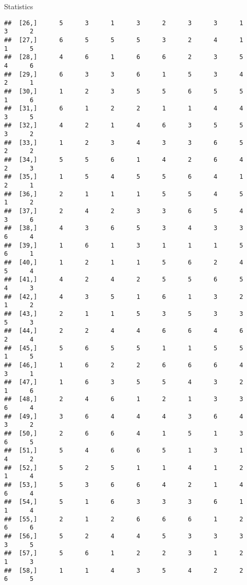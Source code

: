 \documentclass[
  ignorenonframetext,
]{beamer}
\begin{document}
\begin{frame}[fragile]{Statistics}
\begin{verbatim}
##  [26,]      5      3      1      3      2      3      3      1      3      2
##  [27,]      6      5      5      5      3      2      4      1      1      5
##  [28,]      4      6      1      6      6      2      3      5      4      6
##  [29,]      6      3      3      6      1      5      3      4      2      1
##  [30,]      1      2      3      5      5      6      5      5      1      6
##  [31,]      6      1      2      2      1      1      4      4      3      5
##  [32,]      4      2      1      4      6      3      5      5      3      2
##  [33,]      1      2      3      4      3      3      6      5      2      2
##  [34,]      5      5      6      1      4      2      6      4      2      3
##  [35,]      1      5      4      5      5      6      4      1      2      1
##  [36,]      2      1      1      1      5      5      4      5      1      2
##  [37,]      2      4      2      3      3      6      5      4      3      6
##  [38,]      4      3      6      5      3      4      3      3      6      4
##  [39,]      1      6      1      3      1      1      1      5      6      1
##  [40,]      1      2      1      1      5      6      2      4      5      4
##  [41,]      4      2      4      2      5      5      6      5      4      3
##  [42,]      4      3      5      1      6      1      3      2      1      2
##  [43,]      2      1      1      5      3      5      3      3      5      3
##  [44,]      2      2      4      4      6      6      4      6      2      4
##  [45,]      5      6      5      5      1      1      5      5      1      5
##  [46,]      1      6      2      2      6      6      6      4      3      1
##  [47,]      1      6      3      5      5      4      3      2      1      6
##  [48,]      2      4      6      1      2      1      3      3      6      4
##  [49,]      3      6      4      4      4      3      6      4      3      2
##  [50,]      2      6      6      4      1      5      1      3      6      5
##  [51,]      5      4      6      6      5      1      3      1      4      2
##  [52,]      5      2      5      1      1      4      1      2      1      4
##  [53,]      5      3      6      6      4      2      1      4      6      4
##  [54,]      5      1      6      3      3      3      6      1      1      4
##  [55,]      2      1      2      6      6      6      1      2      6      6
##  [56,]      5      2      4      4      5      3      3      3      3      5
##  [57,]      5      6      1      2      2      3      1      2      1      3
##  [58,]      1      1      4      3      5      4      2      2      6      5

\end{verbatim}
\end{frame}
\end{document}

